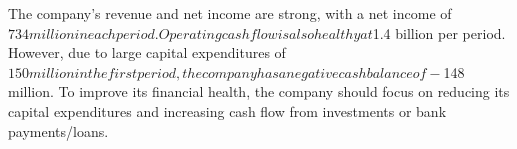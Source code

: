 

The company's revenue and net income are strong, with a net income of $734 million in each period. Operating cash flow is also healthy at $1.4 billion per period. However, due to large capital expenditures of $150 million in the first period, the company has a negative cash balance of -$148 million. To improve its financial health, the company should focus on reducing its capital expenditures and increasing cash flow from investments or bank payments/loans.